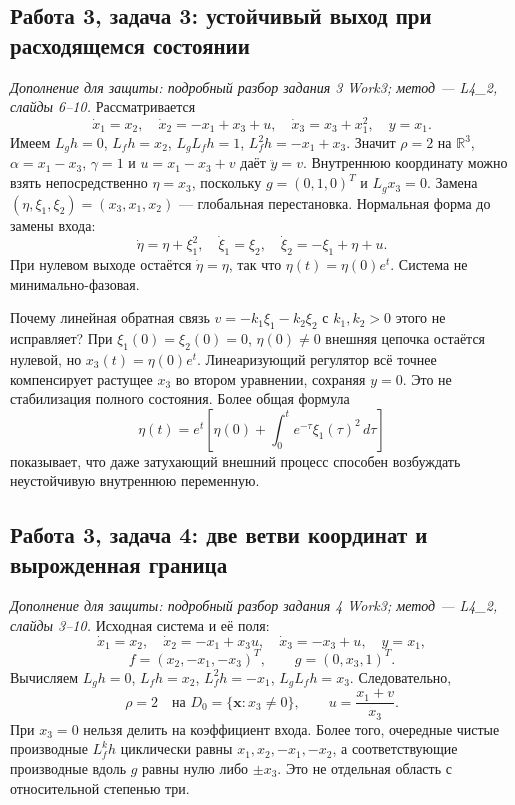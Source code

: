 \subsection{Работа 3, задача 3: устойчивый выход при расходящемся состоянии}

\textit{Дополнение для защиты: подробный разбор задания 3 Work3;
метод --- L4\_2, слайды 6--10.}
Рассматривается
\[
 \dot x_1=x_2,\quad\dot x_2=-x_1+x_3+u,\quad
 \dot x_3=x_3+x_1^2,\quad y=x_1.
\]
Имеем $L_gh=0$, $L_fh=x_2$, $L_gL_fh=1$,
$L_f^2h=-x_1+x_3$. Значит $\rho=2$ на $\mathbb R^3$,
$\alpha=x_1-x_3$, $\gamma=1$ и
$u=x_1-x_3+v$ даёт $\ddot y=v$.
Внутреннюю координату можно взять непосредственно $\eta=x_3$,
поскольку $g=(0,1,0)^T$ и $L_gx_3=0$.
Замена $(\eta,\xi_1,\xi_2)=(x_3,x_1,x_2)$ --- глобальная перестановка.
Нормальная форма до замены входа:
\[
 \dot\eta=\eta+\xi_1^2,\quad
 \dot\xi_1=\xi_2,\quad
 \dot\xi_2=-\xi_1+\eta+u.
\]
При нулевом выходе остаётся $\dot\eta=\eta$, так что
$\eta(t)=\eta(0)e^t$. Система не минимально-фазовая.

Почему линейная обратная связь $v=-k_1\xi_1-k_2\xi_2$ с
$k_1,k_2>0$ этого не исправляет? При
$\xi_1(0)=\xi_2(0)=0$, $\eta(0)\ne0$ внешняя цепочка остаётся
нулевой, но $x_3(t)=\eta(0)e^t$. Линеаризующий регулятор всё точнее
компенсирует растущее $x_3$ во втором уравнении, сохраняя $y=0$.
Это не стабилизация полного состояния.
Более общая формула
\[
 \eta(t)=e^t\left[\eta(0)+\int_0^t e^{-\tau}\xi_1(\tau)^2\,d\tau\right]
\]
показывает, что даже затухающий внешний процесс способен возбуждать
неустойчивую внутреннюю переменную.

\subsection{Работа 3, задача 4: две ветви координат и вырожденная граница}

\textit{Дополнение для защиты: подробный разбор задания 4 Work3;
метод --- L4\_2, слайды 3--10.}
Исходная система и её поля:
\[
 \dot x_1=x_2,\quad\dot x_2=-x_1+x_3u,\quad
 \dot x_3=-x_3+u,\quad y=x_1,
\]
\[
 f=(x_2,-x_1,-x_3)^T,\qquad g=(0,x_3,1)^T.
\]
Вычисляем $L_gh=0$, $L_fh=x_2$, $L_f^2h=-x_1$,
$L_gL_fh=x_3$. Следовательно,
\[
 \rho=2\quad\text{на }D_0=\{\bm x:x_3\ne0\},\qquad
 u=\frac{x_1+v}{x_3}.
\]
При $x_3=0$ нельзя делить на коэффициент входа. Более того, очередные
чистые производные $L_f^kh$ циклически равны $x_1,x_2,-x_1,-x_2$,
а соответствующие производные вдоль $g$ равны нулю либо $\pm x_3$.
Это не отдельная область с относительной степенью три.

